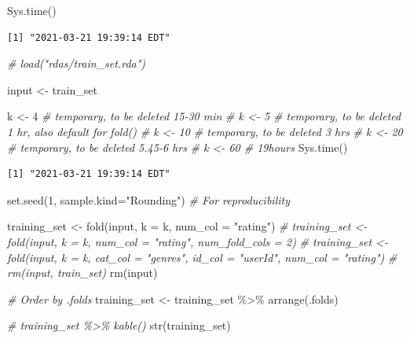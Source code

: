 \documentclass[
]{article}
\newenvironment{Shaded}{}{}
\newcommand{\AttributeTok}[1]{\textcolor[rgb]{0.49,0.56,0.16}{#1}}
\newcommand{\CommentTok}[1]{\textcolor[rgb]{0.38,0.63,0.69}{\textit{#1}}}
\newcommand{\DecValTok}[1]{\textcolor[rgb]{0.25,0.63,0.44}{#1}}
\newcommand{\FunctionTok}[1]{\textcolor[rgb]{0.02,0.16,0.49}{#1}}
\newcommand{\NormalTok}[1]{#1}
\newcommand{\OtherTok}[1]{\textcolor[rgb]{0.00,0.44,0.13}{#1}}
\newcommand{\SpecialCharTok}[1]{\textcolor[rgb]{0.25,0.44,0.63}{#1}}
\newcommand{\StringTok}[1]{\textcolor[rgb]{0.25,0.44,0.63}{#1}}
\begin{document}
\begin{Shaded}
\begin{Highlighting}[]
\FunctionTok{Sys.time}\NormalTok{()}
\end{Highlighting}
\end{Shaded}

\begin{verbatim}
[1] "2021-03-21 19:39:14 EDT"
\end{verbatim}

\begin{Shaded}
\begin{Highlighting}[]
\CommentTok{\# load("rdas/train\_set.rda")}

\NormalTok{input }\OtherTok{\textless{}{-}}\NormalTok{ train\_set}

\NormalTok{k }\OtherTok{\textless{}{-}} \DecValTok{4} \CommentTok{\# temporary, to be deleted  15{-}30 min}
\CommentTok{\# k \textless{}{-} 5 \# temporary, to be deleted  1 hr, also default for fold()}
\CommentTok{\# k \textless{}{-} 10 \# temporary, to be deleted 3 hrs}
\CommentTok{\# k \textless{}{-} 20 \# temporary, to be deleted 5.45{-}6 hrs}
\CommentTok{\# k \textless{}{-} 60 \#                          19hours}
\FunctionTok{Sys.time}\NormalTok{()}
\end{Highlighting}
\end{Shaded}

\begin{verbatim}
[1] "2021-03-21 19:39:14 EDT"
\end{verbatim}

\begin{Shaded}
\begin{Highlighting}[]
\FunctionTok{set.seed}\NormalTok{(}\DecValTok{1}\NormalTok{, }\AttributeTok{sample.kind=}\StringTok{"Rounding"}\NormalTok{) }\CommentTok{\# For reproducibility}

\NormalTok{training\_set }\OtherTok{\textless{}{-}} \FunctionTok{fold}\NormalTok{(input, }\AttributeTok{k =}\NormalTok{ k, }\AttributeTok{num\_col =} \StringTok{"rating"}\NormalTok{)}
\CommentTok{\# training\_set \textless{}{-} fold(input, k = k, num\_col = "rating", num\_fold\_cols = 2)}
\CommentTok{\# training\_set \textless{}{-} fold(input, k = k, cat\_col = "genres", id\_col = "userId", num\_col = "rating")}
\CommentTok{\# rm(input, train\_set)}
\FunctionTok{rm}\NormalTok{(input)}

\CommentTok{\# Order by .folds}
\NormalTok{training\_set }\OtherTok{\textless{}{-}}\NormalTok{ training\_set }\SpecialCharTok{\%\textgreater{}\%} \FunctionTok{arrange}\NormalTok{(.folds)}

\CommentTok{\# training\_set \%\textgreater{}\% kable()}
\FunctionTok{str}\NormalTok{(training\_set)}
\end{Highlighting}
\end{Shaded}
\end{document}
